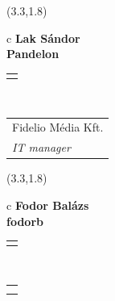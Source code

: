 \documentclass[11pt]{article}
\begin{document}
\makebox(3.3,1.8){
  \renewcommand\arraystretch{1.3}
  \begin{tabular}[c]{c}
    \hspace{8.5mm}
    \LARGE\bf{ Lak Sándor }\\
    \hspace{8.5mm}
    \Large{ Pandelon }\\
    \renewcommand\arraystretch{3}
    \begin{tabular}[c]{c}
      \centering
      \fontfamily{phv}\selectfont{
        \textbf{
          \textsc{
            \scriptsize{
            \color{Bright}{ Ismerkedő }\color{Dark}{ Webmester }\color{Dark}{ Sminkmester }\color{Bright}{ Programozó }
            }
          }
        }
      }
    \end{tabular}
    \\
    \renewcommand\arraystretch{1}
    \begin{tabular}{p{3.3in}}
      \hspace{.7cm}Fidelio Média Kft.\\
      \hspace{.7cm}\emph{ IT manager }\\
    \end{tabular}
  \end{tabular}
}

\makebox(3.3,1.8){
  \renewcommand\arraystretch{1.3}
  \begin{tabular}[c]{c}
    \hspace{8.5mm}
    \LARGE\bf{ Fodor Balázs }\\
    \hspace{8.5mm}
    \Large{ fodorb }\\
    \renewcommand\arraystretch{3}
    \begin{tabular}[c]{c}
      \centering
      \fontfamily{phv}\selectfont{
        \textbf{
          \textsc{
            \scriptsize{
            \color{Dark}{ Ismerkedő }\color{Bright}{ Webmester }\color{Bright}{ Sminkmester }\color{Bright}{ Programozó }
            }
          }
        }
      }
    \end{tabular}
    \\
    \renewcommand\arraystretch{1}
    \begin{tabular}{p{3.3in}}
      \hspace{.7cm}\\
      \hspace{.7cm}\emph{  }\\
    \end{tabular}
  \end{tabular}
}
\end{document}
